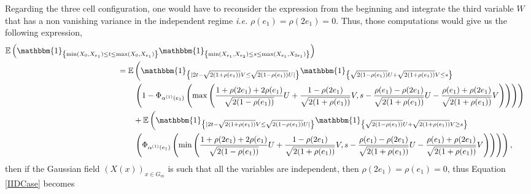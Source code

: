 \documentclass[12pt]{article}
\theoremstyle{Theorem}
\begin{document}
Regarding the three cell configuration, one would have to reconsider the expression from the beginning and integrate the third variable $W$ that has a non vanishing variance in the independent regime \textit{i.e.} $\rho(e_1) = \rho(2e_1)=0$. Thus, those computations would give us the following expression,
{\tiny
\begin{align}
\label{IIDCase}
\mathbb{E}\left(\mathbbm{1}_{\left\{\min(X_{\scriptscriptstyle 0}, X_{e_1}) \leq t \leq \max(X_{\scriptscriptstyle 0}, X_{e_1})\right\}}\mathbbm{1}_{\left\{\min(X_{e_1}, X_{e_2}) \leq s \leq \max(X_{e_1}, X_{2e_1}) \right\}}\right) \nonumber \\
& \hspace{-8.7cm} = \mathbb{E}\left(\mathbbm{1}_{\left\{|2t - \sqrt{2(1+\rho(e_1))}V \leq \sqrt{2(1-\rho(e_1))}U|\right\}}\mathbbm{1}_{\left\{\sqrt{2(1-\rho(e_1))}U + \sqrt{2(1+\rho(e_1))}V \leq s\right\}}\right. \nonumber \\
& \hspace{-8cm} \left. \left(1 - \Phi_{\alpha^{(1)}(e_1)}\left(\max\left(\frac{1 + \rho(2e_1) + 2\rho(e_1)}{\sqrt{2(1-\rho(e_1))}}U + \frac{1-\rho(2e_1)}{\sqrt{2(1+\rho(e_1))}}V, s - \frac{\rho(e_1) - \rho(2e_1)}{\sqrt{2(1+\rho(e_1))}} U - \frac{\rho(e_1) + \rho(2e_1)}{\sqrt{2(1+\rho(e_1))}}V \right) \right)\right)\right) \nonumber\\
& \hspace{-8cm} + \mathbb{E}\left(\mathbbm{1}_{\left\{|2t - \sqrt{2(1+\rho(e_1))}V \leq \sqrt{2(1-\rho(e_1))}U|\right\}}\mathbbm{1}_{\left\{\sqrt{2(1-\rho(e_1))}U+ \sqrt{2(1+\rho(e_1))}V \geq s\right\}}\right. \nonumber\\
& \hspace{-8cm} \left. \left(\Phi_{\alpha^{(1)}(e_1)}\left(\min\left(\frac{1 + \rho(2e_1) + 2\rho(e_1)}{\sqrt{2(1-\rho(e_1))}}U + \frac{1-\rho(2e_1)}{\sqrt{2(1+\rho(e_1))}}V, s - \frac{\rho(e_1) - \rho(2e_1)}{\sqrt{2(1+\rho(e_1))}} U - \frac{\rho(e_1) + \rho(2e_1)}{\sqrt{2(1+\rho(e_1))}}V \right) \right)\right)\right),
\end{align}}then if the Gaussian field $\left(X(x)\right)_{x \in G_{m}}$ is such that all the variables are independent, then $\rho(2e_1) = \rho(e_1) = 0$, thus Equation \eqref{IIDCase} becomes 
\end{document}
